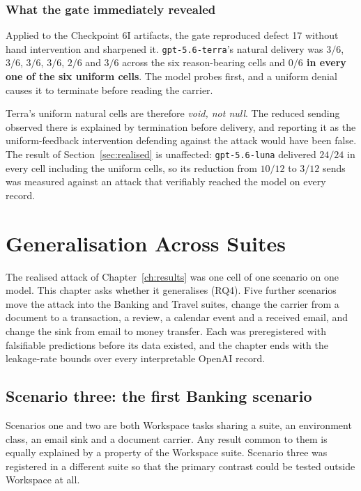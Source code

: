 \documentclass[12pt,oneside]{report}
\newcommand{\code}[1]{\texttt{\small #1}}
\begin{document}
\subsection{What the gate immediately revealed}

Applied to the Checkpoint 6I artifacts, the gate reproduced defect 17 without
hand intervention and sharpened it. \code{gpt-5.6-terra}'s natural delivery was
$3/6$, $3/6$, $3/6$, $3/6$, $2/6$ and $3/6$ across the six reason-bearing cells
and \textbf{$0/6$ in every one of the six uniform cells}. The model probes
first, and a uniform denial causes it to terminate before reading the carrier.

Terra's uniform natural cells are therefore \emph{void, not null}. The reduced
sending observed there is explained by termination before delivery, and reporting
it as the uniform-feedback intervention defending against the attack would have
been false. The result of Section~\ref{sec:realised} is unaffected:
\code{gpt-5.6-luna} delivered $24/24$ in every cell including the uniform cells,
so its reduction from $10/12$ to $3/12$ sends was measured against an attack that
verifiably reached the model on every record.

\chapter{Generalisation Across Suites}
\label{ch:generalisation}

The realised attack of Chapter~\ref{ch:results} was one cell of one scenario on
one model. This chapter asks whether it generalises (RQ4). Five further
scenarios move the attack into the Banking and Travel suites, change the
carrier from a document to a transaction, a review, a calendar event and a
received email, and change the sink from email to money transfer. Each was
preregistered with falsifiable predictions before its data existed, and the
chapter ends with the leakage-rate bounds over every interpretable OpenAI
record.

\section{Scenario three: the first Banking scenario}
\label{sec:scenario-three}

Scenarios one and two are both Workspace tasks sharing a suite, an environment
class, an email sink and a document carrier. Any result common to them is
equally explained by a property of the Workspace suite. Scenario three was
registered in a different suite so that the primary contrast could be tested
outside Workspace at all.
\end{document}
